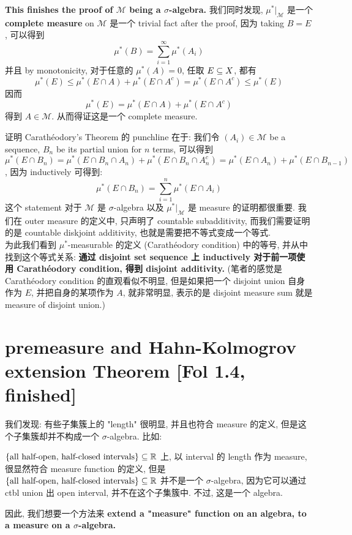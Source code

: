 \documentclass[lang=cn,11pt]{elegantbook}
\begin{document}
\noindent\textbf{This finishes the proof of $\mathcal{M}$ being a $\sigma$-algebra.} 我们同时发现,  $\mu^*|_\mathcal{M}$ 是一个 \textbf{complete measure} on $\mathcal{M}$ 是一个 trivial fact after the proof, 因为 taking $B = E$, 可以得到 
\begin{equation}
    \mu^*(B) = \sum_{i=1}^\infty \mu^*(A_i)
\end{equation}
\noindent 并且 by monotonicity, 对于任意的 $\mu^*(A) = 0$, 任取 $E \subseteq X$, 都有
\begin{equation}
    \mu^*(E )  \leq \mu^*(E \cap A) + \mu^*(E \cap A^c) = \mu^*(E \cap A^c) \leq \mu^*(E)
\end{equation}
因而
\[
\mu^*(E )  = \mu^*(E \cap  A) + \mu^*(E\cap A^c)
\]
得到 $A \in \mathcal{M}$. 从而得证这是一个 complete measure.\\

\begin{remark}
    证明 Carathéodory's Theorem 的 punchline 在于: 我们令 $(A_i) \in \mathcal{M}$ be a sequence, $B_n$ be its partial union for $n$ terms, 可以得到$$\mu^*(E \cap B_n ) = \mu^*(E \cap B_n \cap A_n) + \mu^*(E \cap B_n \cap A_n^c) = \mu^*(E \cap A_n) + \mu^*(E \cap B_{n-1})$$, 因为 inductively 可得到:
\begin{equation}
    \mu^*(E \cap B_n) = \sum_{i=1}^n \mu^*(E \cap  A_i)
\end{equation}
\noindent 这个 statement 对于 $\mathcal{M}$ 是 $\sigma$-algebra 以及 $\mu^*|_{\mathcal{M}}$ 是 measure 的证明都很重要. 我们在 outer measure 的定义中, 只声明了 countable subadditivity, 而我们需要证明的是 countable diskjoint additivity, 也就是需要把不等式变成一个等式. 
\\\noindent 为此我们看到 $\mu^*$-measurable 的定义 (Carathéodory condition) 中的等号, 并从中找到这个等式关系: \textbf{通过 disjoint set sequence 上 inductively 对于前一项使用 Carathéodory condition, 得到 disjoint additivity.} (笔者的感觉是 Carathéodory condition 的直观看似不明显, 但是如果把一个 disjoint union 自身作为 $E$, 并把自身的某项作为 $A$, 就非常明显, 表示的是 disjoint measure sum 就是 measure of disjoint union.)
\end{remark}


\chapter{premeasure and Hahn-Kolmogrov extension Theorem [Fol 1.4, finished]}
我们发现: 有些子集簇上的 "length" 很明显, 并且也符合 measure 的定义, 但是这个子集簇却并不构成一个 $\sigma$-algebra. 比如:
\begin{example}
    $\{ \text{all half-open, half-closed intervals}\} \subseteq \mathbb{R}$ 上, 以 interval 的 length 作为 measure, 很显然符合 measure function 的定义, 但是 $\{ \text{all half-open, half-closed intervals}\} \subseteq \mathbb{R}$ 并不是一个 $\sigma$-algebra, 因为它可以通过 ctbl union 出 open interval, 并不在这个子集簇中. 不过, 这是一个 algebra.\\
\end{example}
因此, 我们想要一个方法来 \textbf{extend a "measure" function on an algebra, to a measure on a $\sigma$-algebra.}
\end{document}
